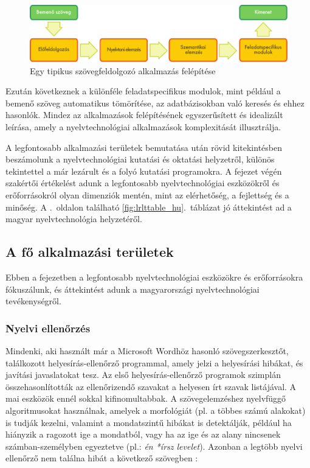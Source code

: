 \begin{multicols}{2}
\begin{figure}[htb]
  \center
  \includegraphics[width=\textwidth]{../_media/hungarian/text_processing_app_architecture}
  \caption{Egy tipikus szövegfeldolgozó alkalmazás felépítése}
  \label{fig:textprocessingarch_de}
\end{figure}

Ezután következnek a különféle feladatspecifikus modulok, mint például a bemenő szöveg automatikus tömörítése, az adatbázisokban való keresés és ehhez hasonlók. Mindez az alkalmazások fel\-épí\-té\-sé\-nek egyszerűsített és idealizált leírása, amely a nyelvtechnológiai alkalmazások komplexitását illusztrálja.  

A legfontosabb alkalmazási területek bemutatása után rövid kitekintésben beszámolunk a nyelvtechnológiai kutatási és oktatási helyzetről, különös tekintettel a már lezárult és a folyó kutatási prog\-ra\-mok\-ra. A fejezet végén szakértői értékelést adunk a legfontosabb nyelvtechnológiai esz\-kö\-zök\-ről és erőforrásokról olyan dimenziók mentén, mint az elérhetőség, a fejlettség és a minőség. A \pageref{fig:lrlttable_hu}.~oldalon található \ref{fig:lrlttable_hu}.~táblázat jó áttekintést ad a magyar nyelvtechnológia helyzetéről.

\subsection{A fő alkalmazási területek} 

Ebben a fejezetben a legfontosabb nyelv\-tech\-no\-ló\-giai eszközökre és erőforrásokra fókuszálunk, és áttekintést adunk a ma\-gyar\-or\-szá\-gi nyelvtechnológiai te\-vé\-keny\-ség\-ről. 

\subsubsection{Nyelvi ellenőrzés}

Mindenki, aki használt már a Microsoft Wordhöz hasonló szövegszerkesztőt, ta\-lál\-ko\-zott helyesírás-ellenőrző programmal, amely jelzi a helyesírási hibákat, és javítási javaslatokat tesz. Az első helyesírás-ellenőrző programok szimplán összehasonlították az ellenőrizendő szavakat a helyesen írt szavak listájával. A mai esz\-kö\-zök ennél sokkal kifinomultabbak. A szövegelemzéshez nyelvfüggő algoritmusokat használnak, amelyek a morfológiát (pl. a többes számú alakokat) is tudják kezelni, valamint a mondatszintű hibákat is detektálják, például ha hiányzik a ragozott ige a mondatból, vagy ha az ige és az alany nincsenek számban-személyben egyeztetve (pl.: \textit{én *írsz levelet}). Azonban a legtöbb nyelvi ellenőrző nem találna hibát a következő szövegben \cite{zar1}:


\end{multicols}
